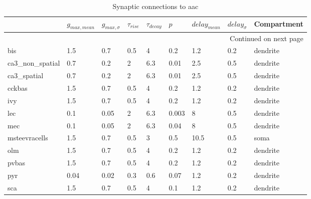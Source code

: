 \begin{longtable}{lllllllll}
\caption{Synaptic connections to aac}\label{aac_synapses}\\
\toprule
{} &  $g_{max, mean}$ & $g_{max, \sigma}$ & $\tau_{rise}$ & $\tau_{decay}$ &   $p$ & $delay_{mean}$ & $delay_{\sigma}$ & Compartment \\
\midrule
\endhead
\midrule
\multicolumn{9}{r}{{Continued on next page}} \\
\midrule
\endfoot

\bottomrule
\endlastfoot
bis             &   1.5 &      0.7 &      0.5 &         4 &    0.2 &   1.2 &       0.2 &      dendrite\ \\
ca3\_non\_spatial &   0.7 &      0.2 &        2 &       6.3 &   0.01 &   2.5 &       0.5 &      dendrite\ \\
ca3\_spatial     &   0.7 &      0.2 &        2 &       6.3 &   0.01 &   2.5 &       0.5 &      dendrite\ \\
cckbas          &   1.5 &      0.7 &      0.5 &         4 &    0.2 &   1.2 &       0.2 &      dendrite\ \\
ivy             &   1.5 &      0.7 &      0.5 &         4 &    0.2 &   1.2 &       0.2 &      dendrite\ \\
lec             &   0.1 &     0.05 &        2 &       6.3 &  0.003 &     8 &       0.5 &      dendrite\ \\
mec             &   0.1 &     0.05 &        2 &       6.3 &   0.04 &     8 &       0.5 &      dendrite\ \\
msteevracells   &   1.5 &      0.7 &      0.5 &         3 &    0.5 &  10.5 &       0.5 &               soma \\
olm             &   1.5 &      0.7 &      0.5 &         4 &    0.2 &   1.2 &       0.2 &      dendrite\ \\
pvbas           &   1.5 &      0.7 &      0.5 &         4 &    0.2 &   1.2 &       0.2 &      dendrite\ \\
pyr             &  0.04 &     0.02 &      0.3 &       0.6 &   0.07 &   1.2 &       0.2 &      dendrite\ \\
sca             &   1.5 &      0.7 &      0.5 &         4 &    0.1 &   1.2 &       0.2 &      dendrite\ \\
\end{longtable}
